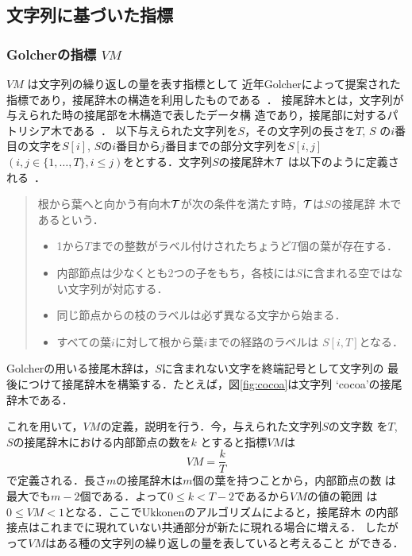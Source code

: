 \documentclass[japanese]{jnlp_JS2.0}
\begin{document}
\subsection{文字列に基づいた指標}

\subsubsection*{Golcherの指標 $\mathit{VM}$}

$\mathit{VM}$ は文字列の繰り返しの量を表す指標として
近年Golcherによって提案された指標であり，接尾辞木の構造を利用したものである~\cite{Golcher}．
接尾辞木とは，文字列が与えられた時の接尾部を木構造で表したデータ構
造であり，接尾部に対するパトリシア木である~\cite{Gusfield}．
以下与えられた文字列を$S$，その文字列の長さを$T$, $S$ の$i$番
目の文字を$S[i]$, $S$の$i$番目から$j$番目までの部分文字列を$S[i,j]$
$(i,j\in\{1,\ldots ,T\}, i \leq j)$をとする．文字列$S$の接尾辞木${\cal T}$
は以下のように定義される~\cite{Ukkonen,Gusfield}．
 \begin{quote}
 根から葉へと向かう有向木${\cal T}$が次の条件を満たす時，${\cal T}$は$S$の接尾辞
 木であるという．
  \begin{itemize}
 \item 1から$T$までの整数がラベル付けされたちょうど$T$個の葉が存在する．
 \item 内部節点は少なくとも2つの子をもち，各枝には$S$に含まれる空ではな
       い文字列が対応する．
 \item 同じ節点からの枝のラベルは必ず異なる文字から始まる．
 \item すべての葉$i$に対して根から葉$i$までの経路のラベルは
       $S[i,T]$となる．
 \end{itemize}
\end{quote}

Golcherの用いる接尾木辞は，$S$に含まれない文字を終端記号として文字列の
最後につけて接尾辞木を構築する．たとえば，図\ref{fig:cocoa}は文字列
`cocoa'の接尾辞木である．




これを用いて，$\mathit{VM}$の定義，説明を行う．今，与えられた文字列$S$の文字数
を$T$, $S$の接尾辞木における内部節点の数を$k$ とすると指標$\mathit{VM}$は
\begin{equation}
 VM = \frac{k}{T}  
\label{eq:v}
\end{equation}
で定義される．長さ$m$の接尾辞木は$m$個の葉を持つことから，内部節点の数
は最大でも$m-2$個である．よって$0\leq k < T-2$であるから$\mathit{VM}$の値の範囲
は$0\leq VM < 1$となる．ここでUkkonenのアルゴリズムによると，接尾辞木
の内部接点はこれまでに現れていない共通部分が新たに現れる場合に増える．
したがって$\mathit{VM}$はある種の文字列の繰り返しの量を表していると考えること
ができる．
\end{document}
